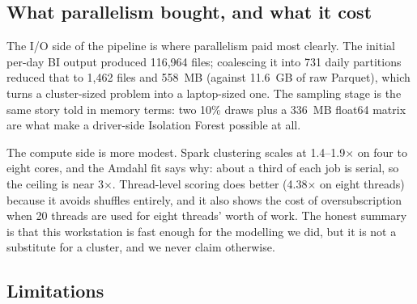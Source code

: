 \documentclass[11pt,a4paper]{article}
\begin{document}
\subsection{What parallelism bought, and what it cost}

The I/O side of the pipeline is where parallelism paid most clearly. The initial per-day BI output produced 116{,}964 files; coalescing it into 731 daily partitions reduced that to 1{,}462 files and 558~MB (against 11.6~GB of raw Parquet), which turns a cluster-sized problem into a laptop-sized one. The sampling stage is the same story told in memory terms: two 10\% draws plus a 336~MB float64 matrix are what make a driver-side Isolation Forest possible at all.

The compute side is more modest. Spark clustering scales at 1.4--1.9$\times$ on four to eight cores, and the Amdahl fit says why: about a third of each job is serial, so the ceiling is near 3$\times$. Thread-level scoring does better (4.38$\times$ on eight threads) because it avoids shuffles entirely, and it also shows the cost of oversubscription when 20 threads are used for eight threads' worth of work. The honest summary is that this workstation is fast enough for the modelling we did, but it is not a substitute for a cluster, and we never claim otherwise.

\subsection{Limitations}
\label{sec:limitations}
\end{document}
